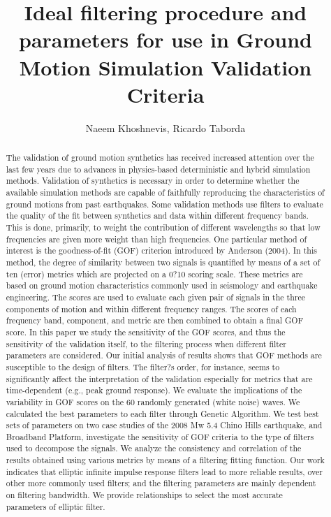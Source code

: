 \documentclass{article}
\title{Ideal filtering procedure and parameters for use in Ground Motion Simulation Validation Criteria}
\author{Naeem Khoshnevis, Ricardo Taborda}
\begin{document}
\thispagestyle{empty}
\maketitle



\newpage

\begin{abstract}

The validation of ground motion synthetics has received increased attention over the last few years due to advances in physics-based deterministic and hybrid simulation methods. Validation of synthetics is necessary in order to determine whether the available simulation methods are capable of faithfully reproducing the characteristics of ground motions from past earthquakes. Some validation methods use filters to evaluate the quality of the fit between synthetics and data within different frequency bands. This is done, primarily, to weight the contribution of different wavelengths so that low frequencies are given more weight than high frequencies. One particular method of interest is the goodness-of-fit (GOF) criterion introduced by Anderson (2004). In this method, the degree of similarity between two signals is quantified by means of a set of ten (error) metrics which are projected on a 0?10 scoring scale. These metrics are based on ground motion characteristics commonly used in seismology and earthquake engineering. The scores are used to evaluate each given pair of signals in the three components of motion and within different frequency ranges. The scores of each frequency band, component, and metric are then combined to obtain a final GOF score. In this paper we study the sensitivity of the GOF scores, and thus the sensitivity of the validation itself, to the filtering process when different filter parameters are considered. Our initial analysis of results shows that GOF methods are susceptible to the design of filters. The filter?s order, for instance, seems to significantly affect the interpretation of the validation especially for metrics that are time-dependent (e.g., peak ground response). We evaluate the implications of the variability in GOF scores on the 60 randomly generated (white noise) waves. We calculated the best parameters to each filter through Genetic Algorithm. We test best sets of parameters on two case studies of the 2008 Mw 5.4 Chino Hills earthquake, and Broadband Platform, investigate the sensitivity of GOF criteria to the type of filters used to decompose the signals. We analyze the consistency and correlation of the results obtained using various metrics by means of a filtering fitting function. Our work indicates that elliptic infinite impulse response filters lead to more reliable results, over other more commonly used filters; and the filtering parameters are mainly dependent on filtering bandwidth. We provide relationships to select the most accurate parameters of elliptic filter.

\end{abstract}
\end{document}
